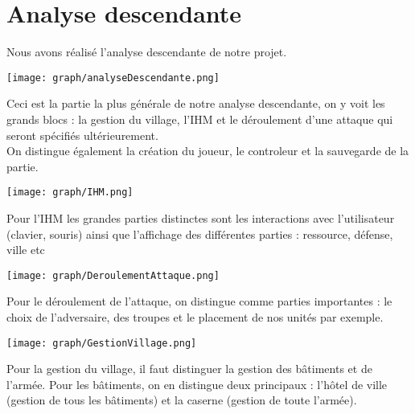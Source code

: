 \chapter{Analyse descendante}
    
	Nous avons réalisé l'analyse descendante de notre projet. 
	
	\texttt{[image: graph/analyseDescendante.png]}
	
	Ceci est la partie la plus générale de notre analyse descendante, on y voit les grands blocs : la gestion du village, l'IHM et le déroulement d'une attaque qui seront spécifiés ultérieurement. \\
	On distingue également la création du joueur, le controleur et la sauvegarde de la partie. 
	
	\texttt{[image: graph/IHM.png]}
	
	Pour l'IHM les grandes parties distinctes sont les interactions avec l'utilisateur (clavier, souris) ainsi que l'affichage des différentes parties : ressource, défense, ville etc

	\texttt{[image: graph/DeroulementAttaque.png]}
	
	Pour le déroulement de l'attaque, on distingue comme parties importantes : le choix de l'adversaire, des troupes et le placement de nos unités par exemple. 

	\texttt{[image: graph/GestionVillage.png]}
	
	Pour la gestion du village, il faut distinguer la gestion des bâtiments et de l'armée. Pour les bâtiments, on en distingue deux principaux : l'hôtel de ville (gestion de tous les bâtiments) et la caserne (gestion de toute l'armée). 

	
	